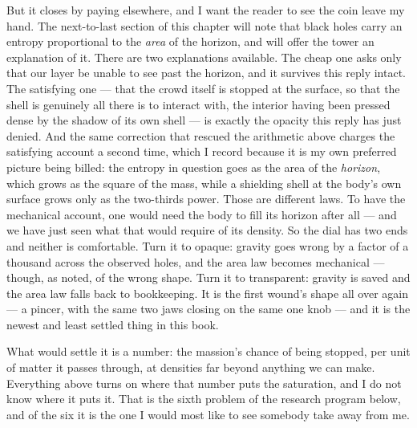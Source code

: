 But it closes by paying elsewhere, and I want the reader to see the coin leave my hand. The next-to-last section of this chapter will note that black holes carry an entropy proportional to the \emph{area} of the horizon, and will offer the tower an explanation of it. There are two explanations available. The cheap one asks only that our layer be unable to see past the horizon, and it survives this reply intact. The satisfying one --- that the crowd itself is stopped at the surface, so that the shell is genuinely all there is to interact with, the interior having been pressed dense by the shadow of its own shell --- is exactly the opacity this reply has just denied. And the same correction that rescued the arithmetic above charges the satisfying account a second time, which I record because it is my own preferred picture being billed: the entropy in question goes as the area of the \emph{horizon}, which grows as the square of the mass, while a shielding shell at the body's own surface grows only as the two-thirds power. Those are different laws. To have the mechanical account, one would need the body to fill its horizon after all --- and we have just seen what that would require of its density. So the dial has two ends and neither is comfortable. Turn it to opaque: gravity goes wrong by a factor of a thousand across the observed holes, and the area law becomes mechanical --- though, as noted, of the wrong shape. Turn it to transparent: gravity is saved and the area law falls back to bookkeeping. It is the first wound's shape all over again --- a pincer, with the same two jaws closing on the same one knob --- and it is the newest and least settled thing in this book.

What would settle it is a number: the massion's chance of being stopped, per unit of matter it passes through, at densities far beyond anything we can make. Everything above turns on where that number puts the saturation, and I do not know where it puts it. That is the sixth problem of the research program below, and of the six it is the one I would most like to see somebody take away from me.

